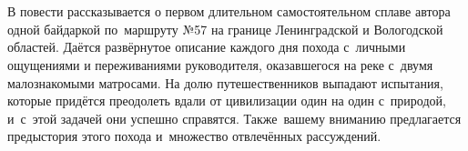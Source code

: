 \chapter*{}
В повести рассказывается о первом длительном самостоятельном сплаве автора одной байдаркой по~маршруту №57 на границе Ленинградской и Вологодской областей. Даётся развёрнутое описание каждого дня похода с~личными ощущениями и переживаниями руководителя, оказавшегося на реке с~двумя малознакомыми матросами. На долю путешественников выпадают испытания, которые придётся преодолеть вдали от цивилизации один на один с~природой, и~с~этой задачей они успешно справятся. Также~вашему вниманию предлагается предыстория этого похода и~множество отвлечённых рассуждений.
